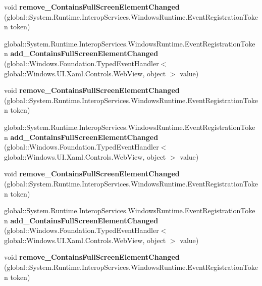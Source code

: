 \begin{DoxyCompactItemize}
void {\bfseries remove\+\_\+\+Contains\+Full\+Screen\+Element\+Changed} (global\+::\+System.\+Runtime.\+Interop\+Services.\+Windows\+Runtime.\+Event\+Registration\+Token token)
\item 
\mbox{\label{interface_windows_1_1_u_i_1_1_xaml_1_1_controls_1_1_i_web_view3_a27cfc7b668036cd493d82322e512bb47}} 
global\+::\+System.\+Runtime.\+Interop\+Services.\+Windows\+Runtime.\+Event\+Registration\+Token {\bfseries add\+\_\+\+Contains\+Full\+Screen\+Element\+Changed} (global\+::\+Windows.\+Foundation.\+Typed\+Event\+Handler$<$ global\+::\+Windows.\+U\+I.\+Xaml.\+Controls.\+Web\+View, object $>$ value)
\item 
\mbox{\label{interface_windows_1_1_u_i_1_1_xaml_1_1_controls_1_1_i_web_view3_a6ad0108837b4ebd70baffc34984d2476}} 
void {\bfseries remove\+\_\+\+Contains\+Full\+Screen\+Element\+Changed} (global\+::\+System.\+Runtime.\+Interop\+Services.\+Windows\+Runtime.\+Event\+Registration\+Token token)
\item 
\mbox{\label{interface_windows_1_1_u_i_1_1_xaml_1_1_controls_1_1_i_web_view3_a27cfc7b668036cd493d82322e512bb47}} 
global\+::\+System.\+Runtime.\+Interop\+Services.\+Windows\+Runtime.\+Event\+Registration\+Token {\bfseries add\+\_\+\+Contains\+Full\+Screen\+Element\+Changed} (global\+::\+Windows.\+Foundation.\+Typed\+Event\+Handler$<$ global\+::\+Windows.\+U\+I.\+Xaml.\+Controls.\+Web\+View, object $>$ value)
\item 
\mbox{\label{interface_windows_1_1_u_i_1_1_xaml_1_1_controls_1_1_i_web_view3_a6ad0108837b4ebd70baffc34984d2476}} 
void {\bfseries remove\+\_\+\+Contains\+Full\+Screen\+Element\+Changed} (global\+::\+System.\+Runtime.\+Interop\+Services.\+Windows\+Runtime.\+Event\+Registration\+Token token)
\item 
\mbox{\label{interface_windows_1_1_u_i_1_1_xaml_1_1_controls_1_1_i_web_view3_a27cfc7b668036cd493d82322e512bb47}} 
global\+::\+System.\+Runtime.\+Interop\+Services.\+Windows\+Runtime.\+Event\+Registration\+Token {\bfseries add\+\_\+\+Contains\+Full\+Screen\+Element\+Changed} (global\+::\+Windows.\+Foundation.\+Typed\+Event\+Handler$<$ global\+::\+Windows.\+U\+I.\+Xaml.\+Controls.\+Web\+View, object $>$ value)
\item 
\mbox{\label{interface_windows_1_1_u_i_1_1_xaml_1_1_controls_1_1_i_web_view3_a6ad0108837b4ebd70baffc34984d2476}} 
void {\bfseries remove\+\_\+\+Contains\+Full\+Screen\+Element\+Changed} (global\+::\+System.\+Runtime.\+Interop\+Services.\+Windows\+Runtime.\+Event\+Registration\+Token token)
\end{DoxyCompactItemize}



